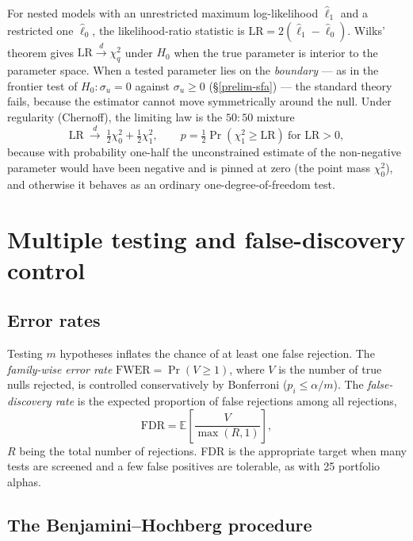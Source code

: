 For nested models with an unrestricted maximum log-likelihood
$\hat\ell_1$ and a restricted one $\hat\ell_0$, the likelihood-ratio
statistic is $\mathrm{LR}=2(\hat\ell_1-\hat\ell_0)$. Wilks' theorem gives
$\mathrm{LR}\xrightarrow{d}\chi^2_q$ under $H_0$ when the true parameter is
interior to the parameter space. When a tested parameter lies on the
\emph{boundary} --- as in the frontier test of $H_0:\sigma_u=0$ against
$\sigma_u\ge 0$ (\S\ref{prelim-sfa}) --- the standard theory fails, because
the estimator cannot move symmetrically around the null. Under regularity
(Chernoff), the limiting law is the $50{:}50$ mixture
\begin{equation}\label{eq:boundary}
\mathrm{LR}\ \xrightarrow{d}\ \tfrac12\chi^2_0+\tfrac12\chi^2_1,
\qquad p=\tfrac12\Pr(\chi^2_1\ge \mathrm{LR})\ \text{for }\mathrm{LR}>0,
\end{equation}
because with probability one-half the unconstrained estimate of the
non-negative parameter would have been negative and is pinned at zero (the
point mass $\chi^2_0$), and otherwise it behaves as an ordinary
one-degree-of-freedom test.

\section{Multiple testing and false-discovery control}\label{prelim-fdr}

\subsection{Error rates}

Testing $m$ hypotheses inflates the chance of at least one false
rejection. The \emph{family-wise error rate}
$\mathrm{FWER}=\Pr(V\ge 1)$, where $V$ is the number of true nulls
rejected, is controlled conservatively by Bonferroni ($p_i\le\alpha/m$).
The \emph{false-discovery rate} is the expected proportion of false
rejections among all rejections,
\begin{equation}
\mathrm{FDR}=\mathbb{E}\!\left[\frac{V}{\max(R,1)}\right],
\end{equation}
$R$ being the total number of rejections. FDR is the appropriate target
when many tests are screened and a few false positives are tolerable, as
with 25 portfolio alphas.

\subsection{The Benjamini--Hochberg procedure}

